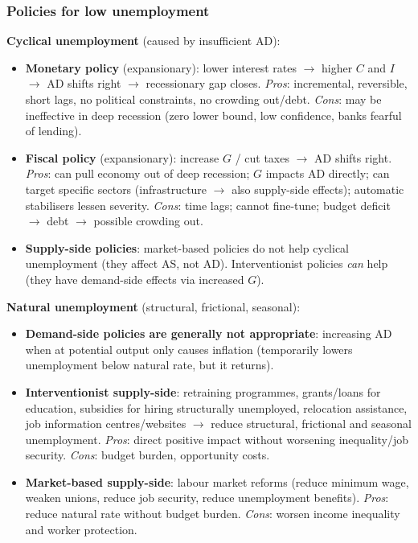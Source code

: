 \documentclass[a4paper,12pt]{article}
\begin{document}
\subsubsection*{Policies for low unemployment}
\textbf{Cyclical unemployment} (caused by insufficient AD):
\begin{itemize}
  \item \textbf{Monetary policy} (expansionary): lower interest rates $\to$ higher $C$ and $I$ $\to$ AD shifts right $\to$ recessionary gap closes. \textit{Pros}: incremental, reversible, short lags, no political constraints, no crowding out/debt. \textit{Cons}: may be ineffective in deep recession (zero lower bound, low confidence, banks fearful of lending).
  \item \textbf{Fiscal policy} (expansionary): increase $G$ / cut taxes $\to$ AD shifts right. \textit{Pros}: can pull economy out of deep recession; $G$ impacts AD directly; can target specific sectors (infrastructure $\to$ also supply-side effects); automatic stabilisers lessen severity. \textit{Cons}: time lags; cannot fine-tune; budget deficit $\to$ debt $\to$ possible crowding out.
  \item \textbf{Supply-side policies}: market-based policies do not help cyclical unemployment (they affect AS, not AD). Interventionist policies \textit{can} help (they have demand-side effects via increased $G$).
\end{itemize}
\textbf{Natural unemployment} (structural, frictional, seasonal):
\begin{itemize}
  \item \textbf{Demand-side policies are generally not appropriate}: increasing AD when at potential output only causes inflation (temporarily lowers unemployment below natural rate, but it returns).
  \item \textbf{Interventionist supply-side}: retraining programmes, grants/loans for education, subsidies for hiring structurally unemployed, relocation assistance, job information centres/websites $\to$ reduce structural, frictional and seasonal unemployment. \textit{Pros}: direct positive impact without worsening inequality/job security. \textit{Cons}: budget burden, opportunity costs.
  \item \textbf{Market-based supply-side}: labour market reforms (reduce minimum wage, weaken unions, reduce job security, reduce unemployment benefits). \textit{Pros}: reduce natural rate without budget burden. \textit{Cons}: worsen income inequality and worker protection.
\end{itemize}
\end{document}

